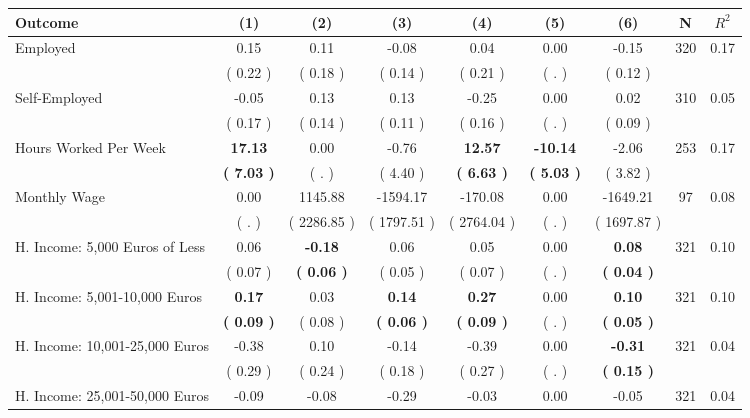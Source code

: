 \begin{tabular}{lcccccccc}
\toprule
 \textbf{Outcome} & \textbf{(1)} & \textbf{(2)} & \textbf{(3)} & \textbf{(4)} & \textbf{(5)} & \textbf{(6)} & \textbf{N} & \textbf{$ R^2$} \\
\midrule
Employed &      0.15 &      0.11 &     -0.08 &      0.04 &      0.00 &     -0.15 & 320 &       0.17 \\ 
 & (     0.22 ) & (     0.18 ) & (     0.14 ) & (     0.21 ) & (        . ) & (     0.12 ) & \\
Self-Employed &     -0.05 &      0.13 &      0.13 &     -0.25 &      0.00 &      0.02 & 310 &       0.05 \\ 
 & (     0.17 ) & (     0.14 ) & (     0.11 ) & (     0.16 ) & (        . ) & (     0.09 ) & \\
Hours Worked Per Week & \textbf{    17.13} &      0.00 &     -0.76 & \textbf{    12.57} & \textbf{   -10.14} &     -2.06 & 253 &       0.17 \\ 
 & \textbf{(     7.03 )} & (        . ) & (     4.40 ) & \textbf{(     6.63 )} & \textbf{(     5.03 )} & (     3.82 ) & \\
Monthly Wage &      0.00 &   1145.88 &  -1594.17 &   -170.08 &      0.00 &  -1649.21 & 97 &       0.08 \\ 
 & (        . ) & (  2286.85 ) & (  1797.51 ) & (  2764.04 ) & (        . ) & (  1697.87 ) & \\
H. Income: 5,000 Euros of Less &      0.06 & \textbf{    -0.18} &      0.06 &      0.05 &      0.00 & \textbf{     0.08} & 321 &       0.10 \\ 
 & (     0.07 ) & \textbf{(     0.06 )} & (     0.05 ) & (     0.07 ) & (        . ) & \textbf{(     0.04 )} & \\
H. Income: 5,001-10,000 Euros & \textbf{     0.17} &      0.03 & \textbf{     0.14} & \textbf{     0.27} &      0.00 & \textbf{     0.10} & 321 &       0.10 \\ 
 & \textbf{(     0.09 )} & (     0.08 ) & \textbf{(     0.06 )} & \textbf{(     0.09 )} & (        . ) & \textbf{(     0.05 )} & \\
H. Income: 10,001-25,000 Euros &     -0.38 &      0.10 &     -0.14 &     -0.39 &      0.00 & \textbf{    -0.31} & 321 &       0.04 \\ 
 & (     0.29 ) & (     0.24 ) & (     0.18 ) & (     0.27 ) & (        . ) & \textbf{(     0.15 )} & \\
H. Income: 25,001-50,000 Euros &     -0.09 &     -0.08 &     -0.29 &     -0.03 &      0.00 &     -0.05 & 321 &       0.04 \\ 

\end{tabular}
